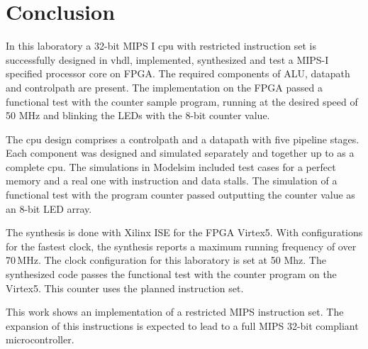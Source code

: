 \chapter{Conclusion}
In this laboratory a 32-bit MIPS I cpu with restricted instruction set is successfully designed in vhdl, implemented, synthesized and test a MIPS-I specified processor core on FPGA. 
The required components of ALU, datapath and controlpath are present.
The implementation on the FPGA passed a functional test with the counter sample program, running at the desired speed of 50 MHz and blinking the LEDs with the 8-bit counter value.

The cpu design comprises a controlpath and a datapath with five pipeline stages.  Each component was designed and simulated separately and
together up to as a complete cpu. The simulations in Modelsim included test cases for a perfect memory and a real one with instruction and data stalls.
The simulation of a functional test with the program counter passed outputting the counter value as an 8-bit LED array.

The synthesis is done with Xilinx ISE for the FPGA Virtex5. With configurations for the fastest clock, the synthesis reports a maximum running
frequency of over 70\,MHz. The clock configuration for this laboratory is set at 50 Mhz. The synthesized code passes the functional test with
the counter program on the Virtex5. This counter uses the planned instruction set.

This work shows an implementation of a restricted MIPS instruction set. The expansion of this instructions is expected to lead to a full MIPS 32-bit compliant microcontroller.